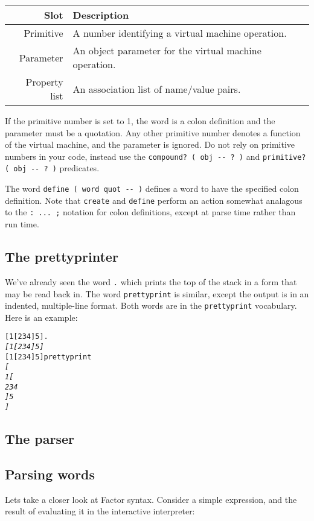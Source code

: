 \documentclass[english]{article}
\providecommand{\tabularnewline}{\\}
\begin{document}
\begin{tabular}{|r|l|}
\hline 
Slot&
Description\tabularnewline
\hline
\hline 
Primitive&
A number identifying a virtual machine operation.\tabularnewline
\hline 
Parameter&
An object parameter for the virtual machine operation.\tabularnewline
\hline 
Property list&
An association list of name/value pairs.\tabularnewline
\hline
\end{tabular}

If the primitive number is set to 1, the word is a colon definition and the parameter must be a quotation. Any other primitive number denotes a function of the virtual machine, and the parameter is ignored. Do not rely on primitive numbers in your code, instead use the \texttt{compound? ( obj -{}- ? )} and \texttt{primitive? ( obj -{}- ? )} predicates.

The word \texttt{define ( word quot -{}- )} defines a word to have the specified colon definition. Note that \texttt{create} and  \texttt{define} perform an action somewhat analagous to the \texttt{: ... ;} notation for colon definitions, except at parse time rather than run time.

\subsection{The prettyprinter}

We've already seen the word \texttt{.} which prints the top of the stack in a form that may be read back in. The word \texttt{prettyprint} is similar, except the output is in an indented, multiple-line format. Both words are in the \texttt{prettyprint} vocabulary. Here is an example:

\begin{alltt}
{[} 1 {[} 2 3 4 {]} 5 {]} .
\emph{{[} 1 {[} 2 3 4 {]} 5 {]}}
{[} 1 {[} 2 3 4 {]} 5 {]} prettyprint
\emph{{[}
    1 {[}
        2 3 4
    {]} 5
{]}}
\end{alltt}


\subsection{The parser}

\subsection{Parsing words}

Lets take a closer look at Factor syntax. Consider a simple expression,
and the result of evaluating it in the interactive interpreter:
\end{document}
